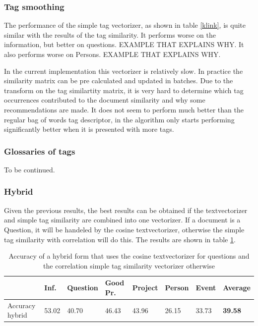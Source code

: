 \subsubsection{Tag smoothing}
The performance of the simple tag vectorizer, as shown in table \ref{klink}, is quite similar with the results of the tag similarity. It performs worse on the information, but better on questions. EXAMPLE THAT EXPLAINS WHY. It also performs worse on Persons. EXAMPLE THAT EXPLAINS WHY. 

In the current implementation this vectorizer is relatively slow. In practice the similarity matrix can be pre calculated and updated in batches. Due to the transform on the tag similartity matrix, it is very hard to determine which tag occurrences contributed to the document similarity and why some recommendations are made. It does not seem to perform much better than the regular bag of words tag descriptor, in \citeauthor{zhou2011web} the algorithm only starts performing significantly better when it is presented with more tags.

\subsubsection{Glossaries of tags}
To be continued.

\subsubsection{Hybrid}
Given the previous results, the best results can be obtained if the textvectorizer and simple tag similarity are combined into one vectorizer. If a document is a Question, it will be handeled by the cosine textvectorizer, otherwise the simple tag similarity with correlation will do this. The results are shown in table \ref{hybrid}. 

\begin{table}
\begin{tabular}{| l | l | l | l | l | l | l | l |}
\hline
 & Inf. &  Question &  Good Pr.& Project & Person &  Event & {\bf Average} \\
\hline
Accuracy hybrid & 53.02 & 40.70 & 46.43 & 43.96 & 26.15 & 33.73 & {\bf 39.58}\\
\hline
\end{tabular}
\caption{Accuracy of a hybrid form that uses the cosine textvectorizer for questions and the correlation simple tag similarity vectorizer otherwise}
\label{hybrid}
\end{table}

